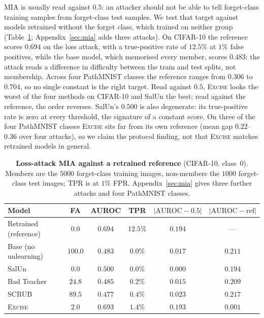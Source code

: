 \documentclass{article}
\newcommand{\ours}{\textsc{Excise}}
\newcommand{\rev}[1]{{\color{revisedB}#1}}
\theoremstyle{remark}
\theoremstyle{plain}
\begin{document}
\rev{MIA is usually read against $0.5$: an attacker should not be able to tell
forget-class training samples from forget-class test samples. We test that
target against models retrained without the forget class, which trained on
neither group (Table~\ref{tab:mia_main}; Appendix~\ref{sec:mia} adds three
attacks). On CIFAR-10 the reference scores $0.694$ on the loss attack, with a
true-positive rate of $12.5\%$ at $1\%$ false positives, while the base model,
which memorised every member, scores $0.483$: the attack reads a difference in
difficulty between the train and test splits, not membership. Across four
PathMNIST classes the reference ranges from $0.306$ to $0.704$, so no single
constant is the right target. Read against $0.5$, \ours{} looks the worst of the
four methods on CIFAR-10 and SalUn the best; read against the reference, the
order reverses. SalUn's $0.500$ is also degenerate: its true-positive rate is
zero at every threshold, the signature of a constant score. On three of the four
PathMNIST classes \ours{} sits far from its own reference (mean gap
$0.22$--$0.36$ over four attacks), so we claim the protocol finding, not that
\ours{} matches retrained models in general.}

\begin{table}[t]
\centering\color{revisedB}
\caption{\rev{\textbf{Loss-attack MIA against a retrained reference}
(CIFAR-10, class~0). Members are the $5000$ forget-class training images,
non-members the $1000$ forget-class test images; TPR is at $1\%$ FPR.
Appendix~\ref{sec:mia} gives three further attacks and four PathMNIST classes.}}
\label{tab:mia_main}
\small
\begin{tabular}{@{}lccccc@{}}
\toprule
Model & FA & AUROC & TPR & $|\mathrm{AUROC}-0.5|$ & $|\mathrm{AUROC}-\mathrm{ref}|$ \\
\midrule
Retrained (reference) & $0.0$   & $0.694$ & $12.5\%$ & $0.194$ & ---   \\
Base (no unlearning)  & $100.0$ & $0.483$ & $0.0\%$  & $0.017$ & $0.211$ \\
\midrule
SalUn                 & $0.0$   & $0.500$ & $0.0\%$  & $\mathbf{0.000}$ & $0.194$ \\
Bad Teacher           & $24.8$  & $0.485$ & $0.2\%$  & $0.015$ & $0.209$ \\
SCRUB                 & $89.5$  & $0.477$ & $0.4\%$  & $0.023$ & $0.217$ \\
\ours{}               & $2.0$   & $0.693$ & $1.4\%$  & $0.193$ & $\mathbf{0.001}$ \\
\bottomrule
\end{tabular}
\end{table}
\end{document}
